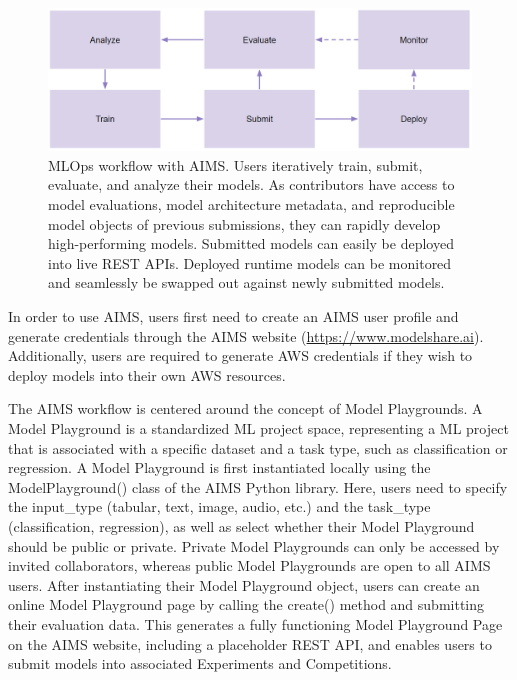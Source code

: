 \begin{figure}
  \centering
  \includegraphics[width=1\textwidth]{figures/fig_aims_workflow.png}
  \caption{MLOps workflow with AIMS. Users iteratively train, submit, evaluate, and analyze their models. As contributors have access to model evaluations, model architecture metadata, and reproducible model objects of previous submissions, they can rapidly develop high-performing models. Submitted models can easily be deployed into live REST APIs. Deployed runtime models can be monitored and seamlessly be swapped out against newly submitted models.}
  \label{fig:fig_aims_workflow}
\end{figure}


In order to use AIMS, users first need to create an AIMS user profile and generate credentials through the AIMS website (\href{https://www.modelshare.ai}{https://www.modelshare.ai}). Additionally, users are required to generate AWS credentials if they wish to deploy models into their own AWS resources. 

The AIMS workflow is centered around the concept of Model Playgrounds. A Model Playground is a standardized ML project space, representing a ML project that is associated with a specific dataset and a task type, such as classification or regression. A Model Playground is first instantiated locally using the ModelPlayground() class of the AIMS Python library. Here, users need to specify the input\_type (tabular, text, image, audio, etc.) and the task\_type (classification, regression), as well as select whether their Model Playground should be public or private. Private Model Playgrounds can only be accessed by invited collaborators, whereas public Model Playgrounds are open to all AIMS users. After instantiating their Model Playground object, users can create an online Model Playground page by calling the create() method and submitting their evaluation data. This generates a fully functioning Model Playground Page on the AIMS website, including a placeholder REST API, and enables users to submit models into associated Experiments and Competitions. 

